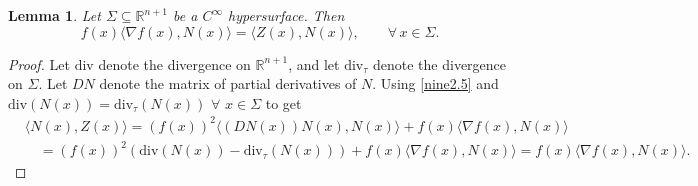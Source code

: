 \documentclass[12pt,reqno]{amsart}
\newtheorem{lemma}[theorem]{Lemma}
\theoremstyle{definition}
\renewcommand{\subset}{\subseteq}
\newcommand{\R}{\mathbb{R}}
\newcommand{\adimn}{n+1}
\begin{document}
\begin{lemma}\label{lemma5}
Let $\Sigma\subset\R^{\adimn}$ be a $C^{\infty}$ hypersurface.  Then
$$f(x)\langle\nabla f(x),N(x)\rangle=\langle Z(x),N(x)\rangle,\qquad\forall\,x\in\Sigma.$$
\end{lemma}
\begin{proof}
Let $\mathrm{div}$ denote the divergence on $\R^{\adimn}$, and let $\mathrm{div}_{\tau}$ denote the divergence on $\Sigma$.  Let $DN$ denote the matrix of partial derivatives of $N$.  Using \eqref{nine2.5} and $\mathrm{div}(N(x))=\mathrm{div}_{\tau}(N(x))$ $\forall$ $x\in\Sigma$ to get
\begin{equation}
\begin{aligned}
&\langle N(x),Z(x)\rangle
=(f(x))^{2}\langle(DN(x))N(x),N(x)\rangle+f(x)\langle\nabla f(x),N(x)\rangle\\
&\quad=(f(x))^{2}(\mathrm{div}(N(x))-\mathrm{div}_{\tau}(N(x)))+f(x)\langle\nabla f(x),N(x)\rangle
=f(x)\langle\nabla f(x),N(x)\rangle.
\end{aligned}
\end{equation}
\end{proof}
\end{document}
